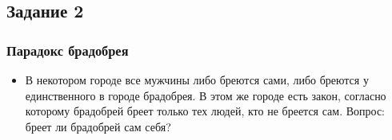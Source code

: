 \documentclass[compress,red]{beamer}
\begin{document}
\subsection{Задание 2}
\begin{frame}[fragile]
  \frametitle{Парадокс брадобрея}
  \begin{itemize}
    \item В некотором городе все мужчины либо бреются сами, либо бреются у единственного в городе брадобрея. В этом же городе есть закон, согласно которому брадобрей бреет только тех людей, кто не бреется сам. Вопрос: бреет ли брадобрей сам себя?
  \end{itemize}
\end{frame}
\end{document}
